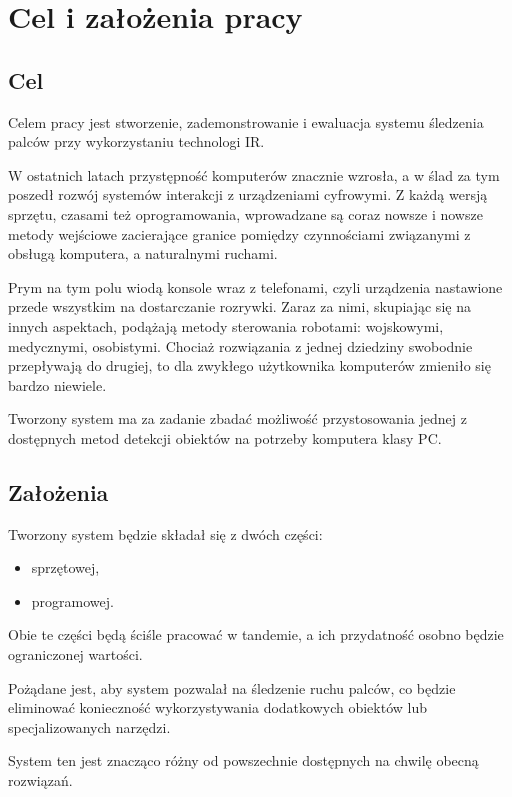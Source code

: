 \chapter{Cel i założenia pracy}\label{ch:purpose}

\section{Cel}

Celem pracy jest stworzenie, zademonstrowanie i ewaluacja systemu śledzenia palców przy wykorzystaniu technologi IR.

W ostatnich latach przystępność komputerów znacznie wzrosła, a w ślad za tym poszedł rozwój systemów interakcji z urządzeniami cyfrowymi. Z każdą wersją sprzętu, czasami też oprogramowania, wprowadzane są coraz nowsze i nowsze metody wejściowe zacierające granice pomiędzy czynnościami związanymi z obsługą komputera, a naturalnymi ruchami.

Prym na tym polu wiodą konsole wraz z telefonami, czyli urządzenia nastawione przede wszystkim na dostarczanie rozrywki. Zaraz za nimi, skupiając się na innych aspektach, podążają metody sterowania robotami: wojskowymi, medycznymi, osobistymi. Chociaż rozwiązania z jednej dziedziny swobodnie przepływają do drugiej, to dla zwykłego użytkownika komputerów zmieniło się bardzo niewiele.

Tworzony system ma za zadanie zbadać możliwość przystosowania jednej z dostępnych metod detekcji obiektów na potrzeby komputera klasy PC.\\

\section{Założenia}

Tworzony system będzie składał się z dwóch części:
\begin{itemize}
 \item sprzętowej,
 \item programowej.
\end{itemize}

Obie te części będą ściśle pracować w tandemie, a ich przydatność osobno będzie ograniczonej wartości.

Pożądane jest, aby system pozwalał na śledzenie ruchu palców, co będzie eliminować konieczność wykorzystywania dodatkowych obiektów lub specjalizowanych narzędzi.

System ten jest znacząco różny od powszechnie dostępnych na chwilę obecną rozwiązań.
